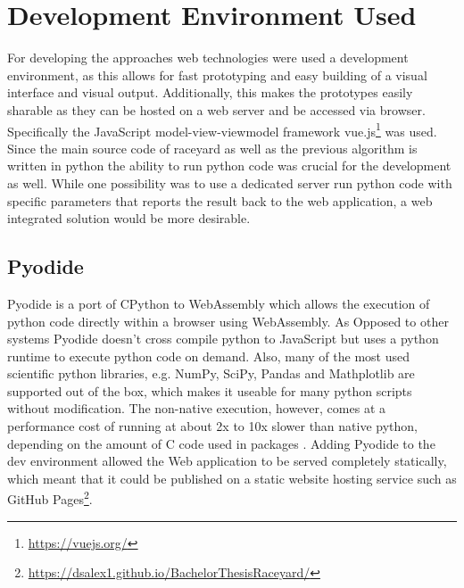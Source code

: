 \section{Development Environment Used}
For developing the approaches web technologies were used a development environment, as this allows for fast prototyping and easy building of a visual interface and visual output. Additionally, this makes the prototypes easily sharable as they can be hosted on a web server and be accessed via browser. Specifically the JavaScript  model-view-viewmodel framework vue.js\footnote{\url{https://vuejs.org/}} was used. Since the main source code of raceyard as well as the previous algorithm is written in python the ability to run python code was crucial for the development as well. While one possibility was to use a dedicated server run python code with specific parameters that reports the result back to the web application, a web integrated solution would be more desirable.

\subsection{Pyodide}
Pyodide is a port of CPython to WebAssembly \cite{pyodide} which allows the execution of python code directly within a browser using WebAssembly. As Opposed to other systems Pyodide doesn't cross compile python to JavaScript but uses a python runtime to execute python code on demand. Also, many of the most used scientific python libraries, e.g. NumPy, SciPy, Pandas and Mathplotlib are supported out of the box, which makes it useable for many python scripts without modification. The non-native execution, however, comes at a performance cost of running at about 2x to 10x slower than native python, depending on the amount of C code used in packages \cite{pyodide2021}\cite{Jangda2019}. Adding Pyodide to the dev environment allowed the Web application to be served completely statically, which meant that it could be published on a static website hosting service such as GitHub Pages\footnote{\url{https://dsalex1.github.io/BachelorThesisRaceyard/}}.